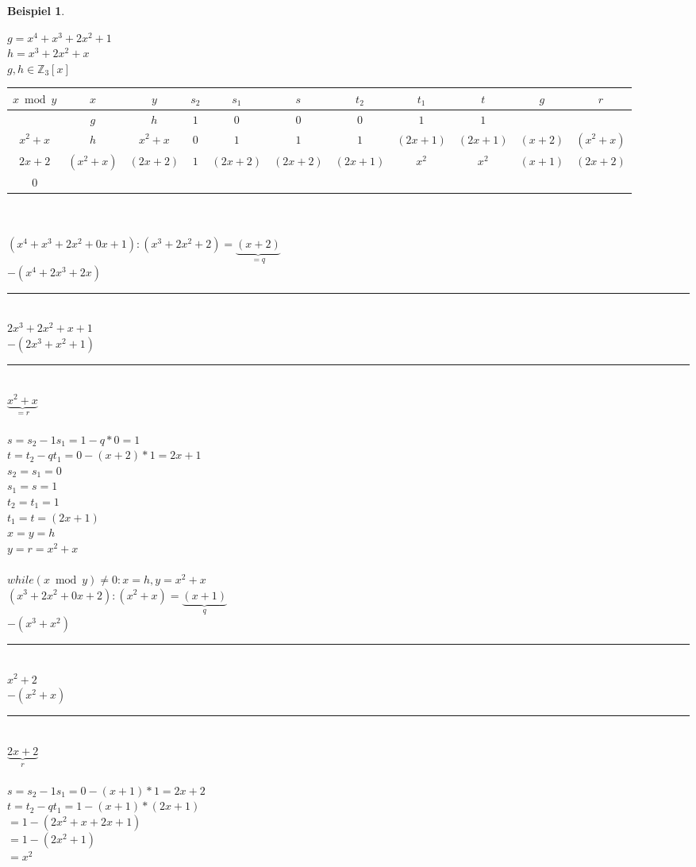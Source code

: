 \documentclass[a4paper,11pt]{article}
\newtheorem{bsp}[definition]{Beispiel}
\begin{document}
\begin{bsp}
\end{bsp}
$g=x^4+x^3+2x^2+1$ \\
$h=x^3+2x^2+x$ \\
$g,h\in\mathbb{Z}_3[x]$ \\
\begin{tabular}{c|c|c|c|c|c|c|c|c|c|c}
	$x\bmod y$ & $x$ & $y$ & $s_2$ & $s_1$ & $s$ & $t_2$ & $t_1$ & $t$ & $g$ & $r$ \\
	\hline 
	& $g$ & $h$ & $1$ & $0$ & $0$ & $0$ & $1$ & $1$ & \\
	$x^2+x$ & $h$ & $x^2+x$ & $0$ & $1$ & $1$ & $1$ & $(2x+1)$ & $(2x+1)$ & $(x+2)$ & $(x^2+x)$ \\
	$2x+2$ & $(x^2+x)$ & $(2x+2)$ & $1$ & $(2x+2)$ & $(2x+2)$ & $(2x+1)$ & $x^2$ & $x^2$ & $(x+1)$ & $(2x+2)$ \\
	0 & & & & & & & & &
\end{tabular} \\
\\
$(x^4+x^3+2x^2+0x+1):(x^3+2x^2+2)=\underbrace{(x+2)}_{=q}$ \\
$-(x^4+2x^3+2x)$ \\
\rule{3cm}{1pt} \\
$2x^3+2x^2+x+1$ \\
$-(2x^3+x^2+1)$ \\
\rule{3cm}{1pt} \\
$\underbrace{x^2+x}_{=r}$ \\
\\
$s=s_2-1s_1=1-q*0=1$ \\
$t=t_2-qt_1=0-(x+2)*1=2x+1$ \\
$s_2=s_1=0$ \\
$s_1=s=1$ \\
$t_2=t_1=1$ \\
$t_1=t=(2x+1)$ \\
$x=y=h$ \\
$y=r=x^2+x$ \\
\\
$while(x\bmod y)\neq0:x=h,y=x^2+x$ \\
$(x^3+2x^2+0x+2):(x^2+x)=\underbrace{(x+1)}_{q}$ \\
$-(x^3+x^2)$ \\
\rule{3cm}{1pt} \\
$x^2+2$ \\
$-(x^2+x)$ \\
\rule{3cm}{1pt} \\
$\underbrace{2x+2}_{r}$ \\
\\
$s=s_2-1s_1=0-(x+1)*1=2x+2$ \\
$t=t_2-qt_1=1-(x+1)*(2x+1)$ \\
$=1-(2x^2+x+2x+1)$ \\
$=1-(2x^2+1)$ \\
$=x^2$ \\
\end{document}
